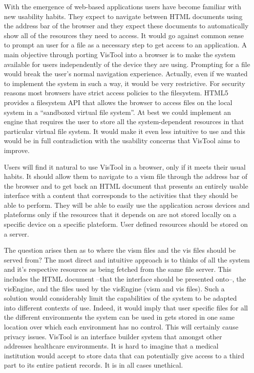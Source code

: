 With the emergence of web-based applications users have become familiar with new usability habits. They expect to navigate between HTML documents using the address bar of the browser and they expect these documents to automatically show all of the resources they need to access. It would go against common sense to prompt an user for a file as a necessary step to get access to an application. A main objective through porting VisTool into a browser is to make the system available for users independently of the device they are using. Prompting for a file would break the user's normal navigation experience. Actually, even if we wanted to implement the system in such a way, it would be very restrictive. For security reasons most browsers have strict access policies to the filesystem. HTML5 provides a filesystem API that allows the browser to access files on the local system in a ``sandboxed virtual file system''\cite{fsAPI}. At best we could implement an engine that requires the user to store all the system-dependent resources in that particular virtual file system. It would make it even less intuitive to use and this would be in full contradiction with the usability concerns that VisTool aims to improve.

Users will find it natural to use VisTool in a browser, only if it meets their usual habits. It should allow them to navigate to a vism file through the address bar of the browser and to get back an HTML document that presents an entirely usable interface with a content that corresponds to the activities that they should be able to perform. They will be able to easily use the application across devices and plateforms only if the resources that it depends on are not stored locally on a specific device on a specific plateform. User defined resources should be stored on a server.

The question arises then as to where the vism files and the vis files should be served from? The most direct and intuitive approach is to thinks of all the system and it's respective resources as being fetched from the same file server. This includes the HTML document --that the interface should be presented onto--, the visEngine, and the files used by the visEngine (vism and vis files). Such a solution would considerably limit the capabilities of the system to be adapted into different contexts of use. Indeed, it would imply that user specific files for all the different environments the system can be used in gets stored in one same location over which each environment has no control. This will certainly cause privacy issues. VisTool is an interface builder system that amongst other addresses healthcare environments. It is hard to imagine that a medical institution would accept to store data that can potentially give access to a third part to its entire patient records. It is in all cases unethical.


